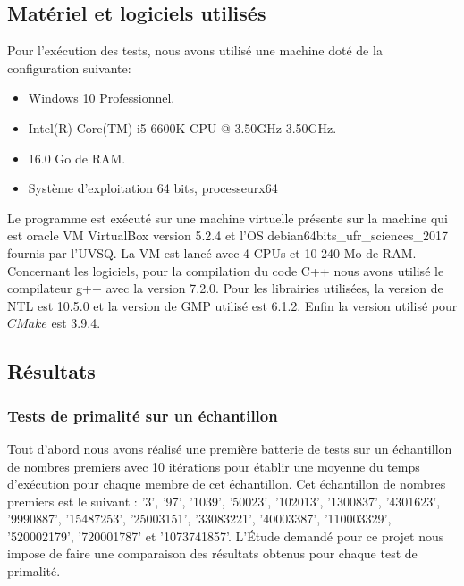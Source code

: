 		\subsection{Matériel et logiciels utilisés}
		Pour l'exécution des tests, nous avons utilisé une machine doté de la configuration suivante:
		\begin{itemize}
		\item Windows 10 Professionnel.
		\item Intel(R) Core(TM) i5-6600K CPU @ 3.50GHz 3.50GHz.
		\item 16.0 Go de RAM.
		\item Système d'exploitation 64 bits, processeurx64
		\end{itemize}
		
Le programme est exécuté sur une machine virtuelle présente sur la machine qui est oracle VM VirtualBox version 5.2.4 et l'OS debian64bits\_ufr\_sciences\_2017 fournis par l'UVSQ. La VM est lancé avec 4 CPUs et 10 240 Mo de RAM.\\
		Concernant les logiciels, pour la compilation du code C++ nous avons utilisé le compilateur g++ avec la version 7.2.0. Pour les librairies utilisées, la version de NTL est 10.5.0 et la version de GMP utilisé est 6.1.2. Enfin la version utilisé pour $CMake$ est 3.9.4.
			
		\subsection{Résultats} 		
		\subsubsection{Tests de primalité sur un échantillon}
	Tout d'abord nous avons réalisé une première batterie de tests sur un échantillon de nombres premiers avec 10 itérations pour établir une moyenne du temps d'exécution pour chaque membre de cet échantillon. Cet échantillon de nombres premiers est le suivant : '3', '97', '1039', '50023', '102013', '1300837', '4301623', '9990887', '15487253', '25003151', '33083221', '40003387', '110003329', '520002179', '720001787' et '1073741857'. L’Étude demandé pour ce projet nous impose de faire une comparaison des résultats obtenus pour chaque test de primalité.\\
	
